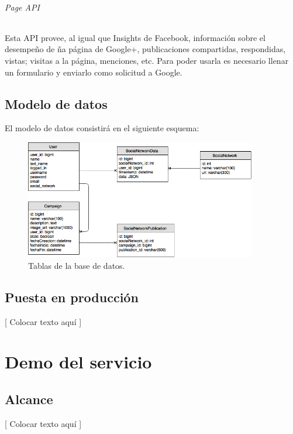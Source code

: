 \documentclass[oneside]{book}
\begin{document}
	\subparagraph*{Page API}
	Esta API provee, al igual que Insights de Facebook, informaci\'{o}n sobre el desempe\~{n}o de ña p\'{a}gina de Google+, publicaciones compartidas, respondidas, vistas; visitas a la p\'{a}gina, menciones, etc. 
	Para poder usarla es necesario llenar un formulario y enviarlo como solicitud a Google.  




\newpage


\section{Modelo de datos}

El modelo de datos consistir\'{a} en el siguiente esquema:
	
\begin{figure}[H]
	\centering
	\includegraphics[width=0.9\textwidth]{images/weepo-01.png}
	\medskip
	\caption{Tablas de la base de datos.}
	\medskip
\end{figure}	
	
\newpage


\section{Puesta en producción}

	[ Colocar texto aquí ]
\bigskip




%
%
\chapter{Demo del servicio}


\section{Alcance}

	[ Colocar texto aquí ]
\bigskip
\end{document}
